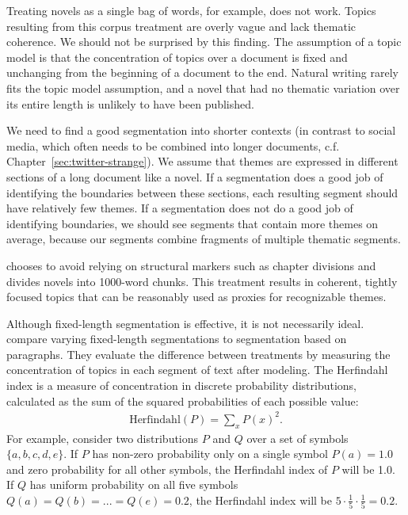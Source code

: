 Treating novels as a single bag of words, for example, does not work.
Topics resulting from this corpus treatment are overly vague and lack thematic coherence.
We should not be surprised by this finding.
The assumption of a topic model is that the concentration of topics over a document is fixed and unchanging from the beginning of a document to the end.
Natural writing rarely fits the topic model assumption, and a novel that had no thematic variation over its entire length is unlikely to have been published.

We need to find a good segmentation into shorter contexts (in contrast to social media, which often needs to be combined into longer documents, c.f. Chapter~\ref{sec:twitter-strange}).
We assume that themes are expressed in different sections of a long document like a novel.
If a segmentation does a good job of identifying the boundaries between these sections, each resulting segment should have relatively few themes.
If a segmentation does not do a good job of identifying boundaries, we should see segments that contain more themes on average, because our segments combine fragments of multiple thematic segments.

 \citet{jockers-13} chooses to avoid relying on structural markers such as chapter divisions and divides novels into 1000-word chunks.
This treatment results in coherent, tightly focused topics that can be reasonably used as proxies for recognizable themes.

Although fixed-length segmentation is effective, it is not necessarily ideal.
\citet{algeehewitt2015paragraphs} compare varying fixed-length segmentations to segmentation based on paragraphs.
They evaluate the difference between treatments by measuring the concentration of topics in each segment of text after modeling.
The Herfindahl index is a measure of concentration in discrete probability distributions, calculated as the sum of the squared probabilities of each possible value:
\begin{align}
\text{Herfindahl}(P) = \sum_x P(x)^2.
\end{align}
For example, consider two distributions $P$ and $Q$ over a set of symbols $\{a, b, c, d, e\}$.
If $P$ has non-zero probability only on a single symbol $P(a) = 1.0$ and zero probability for all other symbols, the Herfindahl index of $P$ will be 1.0.
If $Q$ has uniform probability on all five symbols $Q(a) = Q(b) = ... = Q(e) = 0.2$, the Herfindahl index will be $5 \cdot \frac{1}{5} \cdot \frac{1}{5} = 0.2$.

